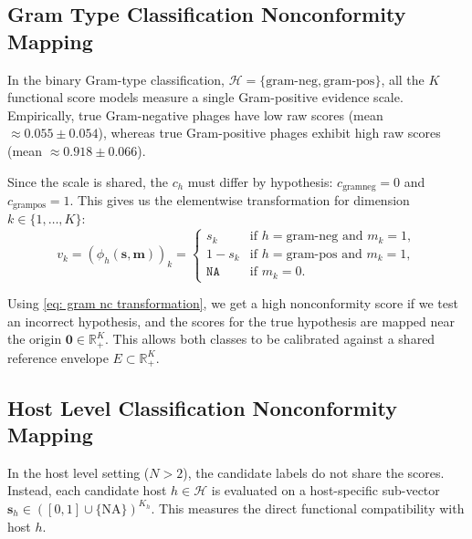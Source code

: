 
\subsection{Gram Type Classification Nonconformity Mapping}
\label{sec3.3.1: gram nc mapping}
In the binary Gram-type classification, $\mathcal{H} = \{\text{gram-neg}, \text{gram-pos}\}$, all the $K$ functional 
score models measure a single Gram-positive evidence scale. Empirically, true Gram-negative phages have low raw scores 
(mean $\approx 0.055 \pm 0.054$), whereas true Gram-positive phages exhibit high raw scores (mean $\approx 0.918 \pm 0.066$).

Since the scale is shared, the $c_h$ must differ by hypothesis: $c_{\text{gramneg}} = 0$ and $c_{\text{grampos}} = 1$. 
This gives us the elementwise transformation for dimension $k \in \{1, \ldots, K\}$:
\begin{equation}
\label{eq: gram nc transformation}
v_k = (\phi_h(\mathbf{s}, \mathbf{m}))_k = \begin{cases} 
s_k & \text{if } h = \text{gram-neg} \text{ and } m_k = 1, \\
1 - s_k & \text{if } h = \text{gram-pos} \text{ and } m_k = 1, \\
\texttt{NA} & \text{if } m_k = 0.
\end{cases}
\end{equation}

Using \eqref{eq: gram nc transformation}, we get a high nonconformity score if we test an incorrect hypothesis, and 
the scores for the true hypothesis are mapped near the origin $\mathbf{0} \in \mathbb{R}_+^K$. This allows both classes 
to be calibrated against a shared reference envelope $E \subset \mathbb{R}_+^K$.



\subsection{Host Level Classification Nonconformity Mapping}
\label{sec3.3.2: host nc mapping}
In the host level setting ($N > 2$), the candidate labels do not share the scores. Instead, each candidate host $h 
\in \mathcal{H}$ is evaluated on a host-specific sub-vector $\mathbf{s}_h \in ([0,1] \cup \{\text{NA}\})^{K_h}$. This measures
the direct functional compatibility with host $h$. 

